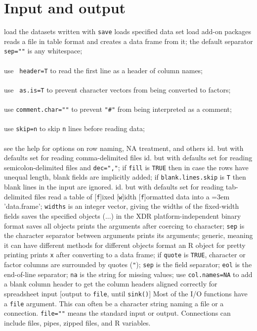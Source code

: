 \section{Input and output}{}
	{load the datasets written with {\tt save}}
	{loads specified data set}
	{load add-on packages}
	{reads a file in table format and creates a data frame
    from it; the default separator {\tt sep=""} is any whitespace;\\\\use {\tt
        header=T} to read the first line as a header of column names;\\\\use {\tt
        as.is=T} to prevent character vectors from being converted to factors;\\\\
    use {\tt comment.char=""} to prevent {\tt "\#"} from being interpreted as a
    comment;\\\\use {\tt skip=n} to skip {\tt n} lines before reading data;\\\\see
    the help for options on row naming, NA treatment, and others}
	{id. but with defaults set for reading comma-delimited files}
	{id. but with defaults set for reading semicolon-delimited files and {\tt dec=","}; if {\tt fill} is
{\tt TRUE} then in case the rows have unequal length, blank fields are implicitly added; if {\tt blank.lines.skip} is {\tt T} then blank lines in the input are ignored.}
	{id. but with defaults set for reading tab-delimited files}
	{
    read a table of [{\tt f}]ixed [{\tt w}]idth [{\tt f}]or\-mat\-ted data into a
    \emergencystretch=3em 'data.frame'; {\tt widths} is an integer vector,
    giving the widths of the fixed-width fields}
	{saves the specified objects (...) in the XDR
    platform-independent binary format}
	{saves all objects}
	{prints the arguments after
    coercing to character; {\tt sep} is the character separator between
    arguments}
	{prints its arguments; generic, meaning it can
    have different methods for different objects}
	{format an R object for pretty printing}
	{prints {\tt x} after converting to a data frame; if {\tt quote} is {\tt TRUE}, character or factor columns are surrounded by quotes
    ({\tt "}); {\tt sep} is the field separator; {\tt eol} is the
    end-of-line separator; {\tt na} is the string for missing values;
    use {\tt col.names=NA} to add a blank column header to get the
    column headers aligned correctly for spreadsheet input}
	{[output to {\tt file}, until {\tt sink()}] Most
    of the I/O functions have a {\tt file} argument. This can often be a
    character string naming a file or a connection.  {\tt file=""} means
    the standard input or output. Connections can include files, pipes,
    zipped files, and R variables.}

